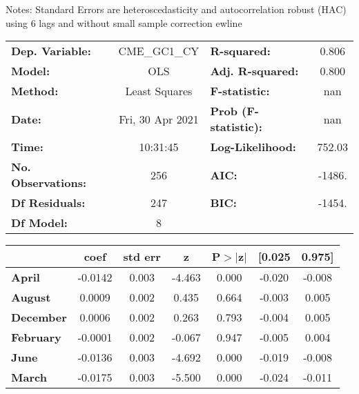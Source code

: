 Notes: \newline
 [1] Standard Errors are heteroscedasticity and autocorrelation robust (HAC) using 6 lags and without small sample correction
ewline\begin{center}
\begin{tabular}{lclc}
\toprule
\textbf{Dep. Variable:}    &   CME\_GC1\_CY   & \textbf{  R-squared:         } &     0.806   \\
\textbf{Model:}            &       OLS        & \textbf{  Adj. R-squared:    } &     0.800   \\
\textbf{Method:}           &  Least Squares   & \textbf{  F-statistic:       } &       nan   \\
\textbf{Date:}             & Fri, 30 Apr 2021 & \textbf{  Prob (F-statistic):} &      nan    \\
\textbf{Time:}             &     10:31:45     & \textbf{  Log-Likelihood:    } &    752.03   \\
\textbf{No. Observations:} &         256      & \textbf{  AIC:               } &    -1486.   \\
\textbf{Df Residuals:}     &         247      & \textbf{  BIC:               } &    -1454.   \\
\textbf{Df Model:}         &           8      & \textbf{                     } &             \\
\bottomrule
\end{tabular}
\begin{tabular}{lcccccc}
                  & \textbf{coef} & \textbf{std err} & \textbf{z} & \textbf{P$> |$z$|$} & \textbf{[0.025} & \textbf{0.975]}  \\
\midrule
\textbf{April}    &      -0.0142  &        0.003     &    -4.463  &         0.000        &       -0.020    &       -0.008     \\
\textbf{August}   &       0.0009  &        0.002     &     0.435  &         0.664        &       -0.003    &        0.005     \\
\textbf{December} &       0.0006  &        0.002     &     0.263  &         0.793        &       -0.004    &        0.005     \\
\textbf{February} &      -0.0001  &        0.002     &    -0.067  &         0.947        &       -0.005    &        0.004     \\
\textbf{June}     &      -0.0136  &        0.003     &    -4.692  &         0.000        &       -0.019    &       -0.008     \\
\textbf{March}    &      -0.0175  &        0.003     &    -5.500  &         0.000        &       -0.024    &       -0.011     \\

\end{tabular}
\end{center}

